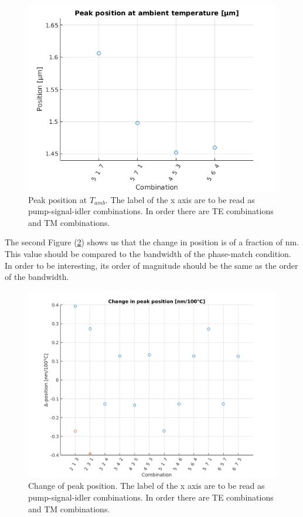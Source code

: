 \documentclass[12pt,a4paper,twoside]{article}
\begin{document}
\begin{figure}[!h]
	\centering
	\includegraphics[width=.85\textwidth]{ppaat22.png}
	\caption{Peak position at $T_{amb}$. The label of the x axis are to be read as pump-signal-idler combinations. In order there are TE combinations and TM combinations.}
	\label{fig_sym_pp@t2} 	%
\end{figure}

The second Figure (\ref{fig_sym_ppc2}) shows us that the change in position is of a fraction of \si{\nm}.
This value should be compared to the bandwidth of the phase-match condition.
In order to be interesting, its order of magnitude should be the same as the order of the bandwidth.

\begin{figure}[!h]
	\centering
	\includegraphics[width=.85\textwidth]{ppc2.png}
	\caption{Change of peak position. The label of the x axis are to be read as pump-signal-idler combinations. In order there are TE combinations and TM combinations.}
	\label{fig_sym_ppc2} %
\end{figure}
\end{document}
